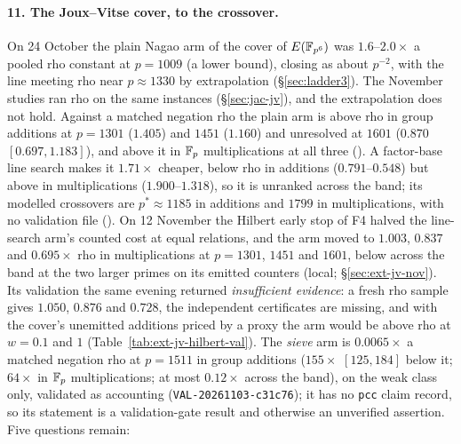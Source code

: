 \paragraph{11. The Joux--Vitse cover, to the crossover.} On 24 October the
plain Nagao arm of the cover of $E(\mathbb{F}_{p^6})$ was $1.6$--$2.0\times$ a
pooled rho constant at $p=1009$ (a lower bound), closing as about
$p^{-2}$, with the line meeting rho near $p\approx1330$ by extrapolation
(\S\ref{sec:ladder3}). The November studies ran rho on the same instances
(\S\ref{sec:jac-jv}), and the extrapolation does not hold. Against a
matched negation rho the plain arm is above rho in group additions at
$p=1301$ ($1.405$) and $1451$ ($1.160$) and unresolved at $1601$
($0.870$ $[0.697,1.183]$), and above it in $\mathbb{F}_p$ multiplications at all
three (). A factor-base
line search makes it $1.71\times$ cheaper, below rho in additions
($0.791$--$0.548$) but above in multiplications ($1.900$--$1.318$), so it
is unranked across the band; its modelled crossovers are $p^*\approx1185$
in additions and $1799$ in multiplications, with no validation file
(). On 12 November the Hilbert
early stop of F4 halved the line-search arm's counted cost at equal
relations, and the arm moved to $1.003$, $0.837$ and $0.695\times$ rho in
multiplications at $p=1301$, $1451$ and $1601$, below across the band at
the two larger primes on its emitted counters (local;
\S\ref{sec:ext-jv-nov}). Its validation the same evening returned
\emph{insufficient evidence}: a fresh rho sample gives $1.050$, $0.876$ and
$0.728$, the independent certificates are missing, and with the cover's
unemitted additions priced by a proxy the arm would be above rho at
$w=0.1$ and $1$ (Table~\ref{tab:ext-jv-hilbert-val}). The \emph{sieve} arm is
$0.0065\times$ a matched negation rho at $p=1511$ in group additions
($155\times$ $[125,184]$ below it; $64\times$ in $\mathbb{F}_p$
multiplications; at most $0.12\times$ across the band), on the weak class
only, validated as accounting (\texttt{VAL-20261103-c31c76}); it has no
\texttt{pcc} claim record, so its statement is a validation-gate result
and otherwise an unverified assertion. Five questions remain:
